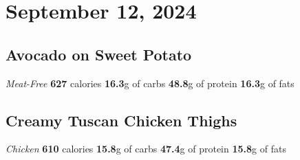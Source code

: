 \documentclass{article}%
\begin{document}
\section*{September 12, 2024}%
\label{sec:September12,2024}%
\begin{paracol}[2]{2}%
\sloppy%
\subsection*{Avocado on Sweet Potato}%
\label{subsec:AvocadoonSweetPotato}%
\textit{Meat{-}Free}%
\newline%
\newline%
\textbf{627} calories%
\newline%
\textbf{16.3}g of carbs%
\newline%
\textbf{48.8}g of protein%
\newline%
\textbf{16.3}g of fats%
\newline%
\switchcolumn

%
\subsection*{Creamy Tuscan Chicken Thighs}%
\label{subsec:CreamyTuscanChickenThighs}%
\textit{Chicken}%
\newline%
\newline%
\textbf{610} calories%
\newline%
\textbf{15.8}g of carbs%
\newline%
\textbf{47.4}g of protein%
\newline%
\textbf{15.8}g of fats%
\newline%
\switchcolumn

%
\end{paracol}

%
\end{document}
